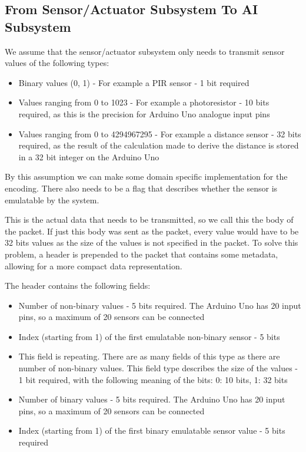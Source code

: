 \subsection{From Sensor/Actuator Subsystem To AI Subsystem}
We assume that the sensor/actuator subsystem only needs to transmit sensor values of the following types:

\begin{itemize}
\item Binary values (0, 1) - For example a PIR sensor - 1 bit required
\item Values ranging from 0 to 1023 - For example a photoresistor - 10 bits required, as this is the precision for Arduino Uno analogue input pins
\item Values ranging from 0 to 4294967295 - For example a distance sensor - 32 bits required, as the result of the calculation made to derive the distance is stored in a 32 bit integer on the Arduino Uno
\end{itemize}
By this assumption we can make some domain specific implementation for the encoding.
There also needs to be a flag that describes whether the sensor is emulatable by the system.

This is the actual data that needs to be transmitted, so we call this the body of the packet. If just this body was sent as the packet, every value would have to be 32 bits values as the size of the values is not specified in the packet. To solve this problem, a header is prepended to the packet that contains some metadata, allowing for a more compact data representation.

The header contains the following fields:

\begin{itemize}
\item Number of non-binary values - 5 bits required. The Arduino Uno has 20 input pins, so a maximum of 20 sensors can be connected
\item Index (starting from 1) of the first emulatable non-binary sensor - 5 bits
\item This field is repeating. There are as many fields of this type   as there are number of non-binary values. This field type describes
the size of the values - 1 bit required, with the following meaning of the bits: 0: 10 bits, 1: 32 bits
\item Number of binary values - 5 bits required. The Arduino Uno has 20 input pins, so a maximum of 20 sensors can be connected
\item Index (starting from 1) of the first binary emulatable sensor value - 5 bits required
\end{itemize}

